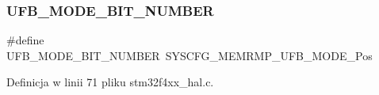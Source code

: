 \subsubsection{\texorpdfstring{U\+F\+B\+\_\+\+M\+O\+D\+E\+\_\+\+B\+I\+T\+\_\+\+N\+U\+M\+B\+ER}{UFB\_MODE\_BIT\_NUMBER}}
{\footnotesize\ttfamily \#define U\+F\+B\+\_\+\+M\+O\+D\+E\+\_\+\+B\+I\+T\+\_\+\+N\+U\+M\+B\+ER~S\+Y\+S\+C\+F\+G\+\_\+\+M\+E\+M\+R\+M\+P\+\_\+\+U\+F\+B\+\_\+\+M\+O\+D\+E\+\_\+\+Pos}



Definicja w linii 71 pliku stm32f4xx\+\_\+hal.\+c.

